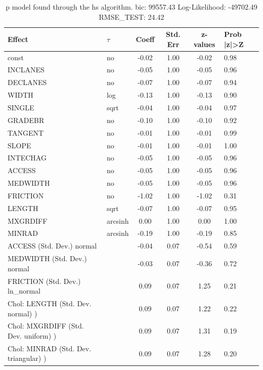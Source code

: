 \begin{table}
	\caption{p model found through the hs algorithm. bic: 99557.43 Log-Likelihood: -49702.49 RMSE_TEST: 24.42}
	\begin{center}
		\begin{tabular}{|l|l|c|c|c|l|}
			\hline
			Effect & $\tau$ & Coeff & Std. Err & z-values & Prob |z|>Z \\
			\hline
			const & no & -0.02 & 1.00 & -0.02 & 0.98 \\
			\hline
			INCLANES & no & -0.05 & 1.00 & -0.05 & 0.96 \\
			\hline
			DECLANES & no & -0.07 & 1.00 & -0.07 & 0.94 \\
			\hline
			WIDTH & log & -0.13 & 1.00 & -0.13 & 0.90 \\
			\hline
			SINGLE & sqrt & -0.04 & 1.00 & -0.04 & 0.97 \\
			\hline
			GRADEBR & no & -0.10 & 1.00 & -0.10 & 0.92 \\
			\hline
			TANGENT & no & -0.01 & 1.00 & -0.01 & 0.99 \\
			\hline
			SLOPE & no & -0.01 & 1.00 & -0.01 & 1.00 \\
			\hline
			INTECHAG & no & -0.05 & 1.00 & -0.05 & 0.96 \\
			\hline
			ACCESS & no & -0.05 & 1.00 & -0.05 & 0.96 \\
			\hline
			MEDWIDTH & no & -0.05 & 1.00 & -0.05 & 0.96 \\
			\hline
			FRICTION & no & -1.02 & 1.00 & -1.02 & 0.31 \\
			\hline
			LENGTH & sqrt & -0.07 & 1.00 & -0.07 & 0.95 \\
			\hline
			MXGRDIFF & arcsinh & 0.00 & 1.00 & 0.00 & 1.00 \\
			\hline
			MINRAD & arcsinh & -0.19 & 1.00 & -0.19 & 0.85 \\
			\hline
			ACCESS (Std. Dev.) normal &  & -0.04 & 0.07 & -0.54 & 0.59 \\
			\hline
			MEDWIDTH (Std. Dev.) normal &  & -0.03 & 0.07 & -0.36 & 0.72 \\
			\hline
			FRICTION (Std. Dev.) ln_normal &  & 0.09 & 0.07 & 1.25 & 0.21 \\
			\hline
			 Chol: LENGTH (Std. Dev. normal) ) &  & 0.09 & 0.07 & 1.22 & 0.22 \\
			\hline
			 Chol: MXGRDIFF (Std. Dev. uniform) ) &  & 0.09 & 0.07 & 1.31 & 0.19 \\
			\hline
			 Chol: MINRAD (Std. Dev. triangular) ) &  & 0.09 & 0.07 & 1.28 & 0.20 \\

\end{tabular}
\end{center}
\end{table}

